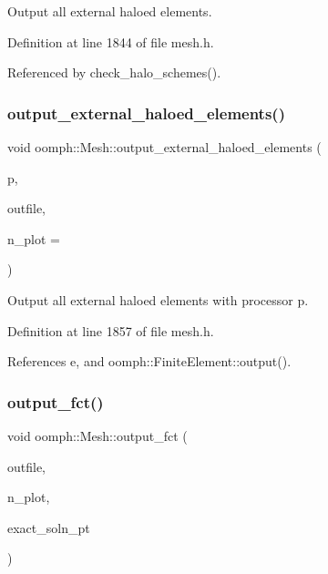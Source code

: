 Output all external haloed elements. 



Definition at line 1844 of file mesh.\+h.



Referenced by check\+\_\+halo\+\_\+schemes().

\mbox{\label{classoomph_1_1Mesh_a6b816df2fde8c72be3fb20d1ea55cd72}} 
\subsubsection{\texorpdfstring{output\+\_\+external\+\_\+haloed\+\_\+elements()}{output\_external\_haloed\_elements()}\hspace{0.1cm}{\footnotesize\ttfamily [2/2]}}
{\footnotesize\ttfamily void oomph\+::\+Mesh\+::output\+\_\+external\+\_\+haloed\+\_\+elements (\begin{DoxyParamCaption}\item[{const unsigned \&}]{p,  }\item[{std\+::ostream \&}]{outfile,  }\item[{const unsigned \&}]{n\+\_\+plot = {} }\end{DoxyParamCaption})\hspace{0.3cm}{\ttfamily [inline]}}



Output all external haloed elements with processor p. 



Definition at line 1857 of file mesh.\+h.



References e, and oomph\+::\+Finite\+Element\+::output().

\mbox{\label{classoomph_1_1Mesh_a7c5d6492f33fcd0dc7a65b7bc2a2dde2}} 
\subsubsection{\texorpdfstring{output\+\_\+fct()}{output\_fct()}\hspace{0.1cm}{\footnotesize\ttfamily [1/2]}}
{\footnotesize\ttfamily void oomph\+::\+Mesh\+::output\+\_\+fct (\begin{DoxyParamCaption}\item[{std\+::ostream \&}]{outfile,  }\item[{const unsigned \&}]{n\+\_\+plot,  }\item[{\hyperlink{classoomph_1_1FiniteElement_a690fd33af26cc3e84f39bba6d5a85202}{Finite\+Element\+::\+Steady\+Exact\+Solution\+Fct\+Pt}}]{exact\+\_\+soln\+\_\+pt }\end{DoxyParamCaption})}



